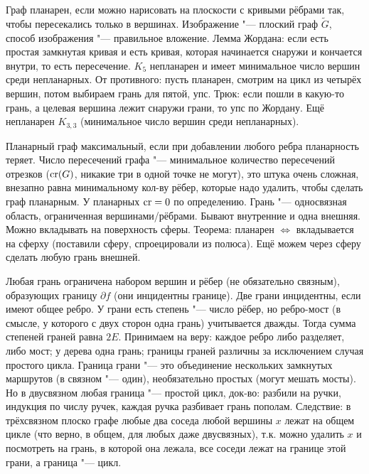 \section{} %
	Граф планарен, если можно нарисовать на плоскости с кривыми рёбрами так, чтобы пересекались только в вершинах.
	Изображение "--- плоский граф $\tilde G$, способ изображения "--- правильное вложение.
	Лемма Жордана: если есть простая замкнутая кривая и есть кривая, которая начинается снаружи и кончается внутри, то есть пересечение.
	$K_5$ непланарен и имеет минимальное число вершин среди непланарных.
	От противного: пусть планарен, смотрим на цикл из четырёх вершин, потом выбираем грань для пятой, упс.
	Трюк: если пошли в какую-то грань, а целевая вершина лежит снаружи грани, то упс по Жордану.
	Ещё непланарен $K_{3,3}$ (минимальное число вершин среди непланарных).

	Планарный граф максимальный, если при добавлении любого ребра планарность теряет.
	Число пересечений графа "--- минимальное количество пересечений отрезков ($\cr(G)$, никакие три в одной точке не могут),
	это штука очень сложная, внезапно равна минимальному кол-ву рёбер, которые надо удалить, чтобы сделать граф планарным.
	У планарных $\cr=0$ по определению.
	Грань "--- односвязная область, ограниченная вершинами/рёбрами.
	Бывают внутренние и одна внешняя.
	Можно вкладывать на поверхность сферы.
	Теорема: планарен $\iff$ вкладывается на сферху (поставили сферу, спроецировали из полюса).
	Ещё можем через сферу сделать любую грань внешней.

	Любая грань ограничена набором вершин и рёбер (не обязательно связным), образующих границу $\partial f$ (они инцидентны границе).
	Две грани инцидентны, если имеют общее ребро.
	У грани есть степень "--- число рёбер, но ребро-мост (в смысле, у которого с двух сторон одна грань) учитывается дважды.
	Тогда сумма степеней граней равна $2E$.
	Принимаем на веру: каждое ребро либо разделяет, либо мост; у дерева одна грань; границы граней различны за исключением случая простого цикла.
	Граница грани "--- это объединение нескольких замкнутых маршрутов (в связном "--- один), необязательно простых (могут мешать мосты).
	Но в двусвязном любая граница "--- простой цикл, док-во: разбили на ручки, индукция по числу ручек, каждая ручка разбивает грань пополам.
	Следствие: в трёхсвязном плоско графе любые два соседа любой вершины $x$ лежат на общем цикле (что верно, в общем, для любых даже двусвязных),
	т.к. можно удалить $x$ и посмотреть на грань, в которой она лежала, все соседи лежат на границе этой грани, а граница "--- цикл.

